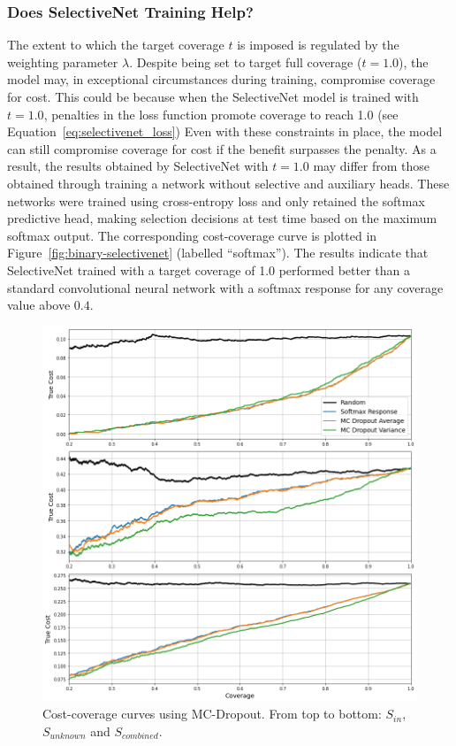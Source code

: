 \subsubsection{Does SelectiveNet Training Help?}
The extent to which the target coverage $t$ is imposed is regulated by the weighting parameter $\lambda$. Despite being set to target full coverage ($t=1.0$), the model may, in exceptional circumstances during training, compromise coverage for cost. This could be because when the SelectiveNet model is trained with $t=1.0$, penalties in the loss function promote coverage to reach 1.0 (see Equation~\ref{eq:selectivenet_loss}) Even with these constraints in place, the model can still compromise coverage for cost if the benefit surpasses the penalty. As a result, the results obtained by SelectiveNet with $t=1.0$ may differ from those obtained through training a network without selective and auxiliary heads. These networks were trained using cross-entropy loss and only retained the softmax predictive head, making selection decisions at test time based on the maximum softmax output. The corresponding cost-coverage curve is plotted in Figure~\ref{fig:binary-selectivenet} (labelled “softmax”). The results indicate that SelectiveNet trained with a target coverage of 1.0 performed better than a standard convolutional neural network with a softmax response for any coverage value above $0.4$.

\begin{figure}[!h]
	\centering
	\includegraphics[width=\textwidth]{images/binary_mcdropout.png}
	\caption{Cost-coverage curves using MC-Dropout. From top to bottom: $S_{in}$, $S_{unknown}$ and $S_{combined}$.}
	\label{fig:binary-mcdropout}
\end{figure}

